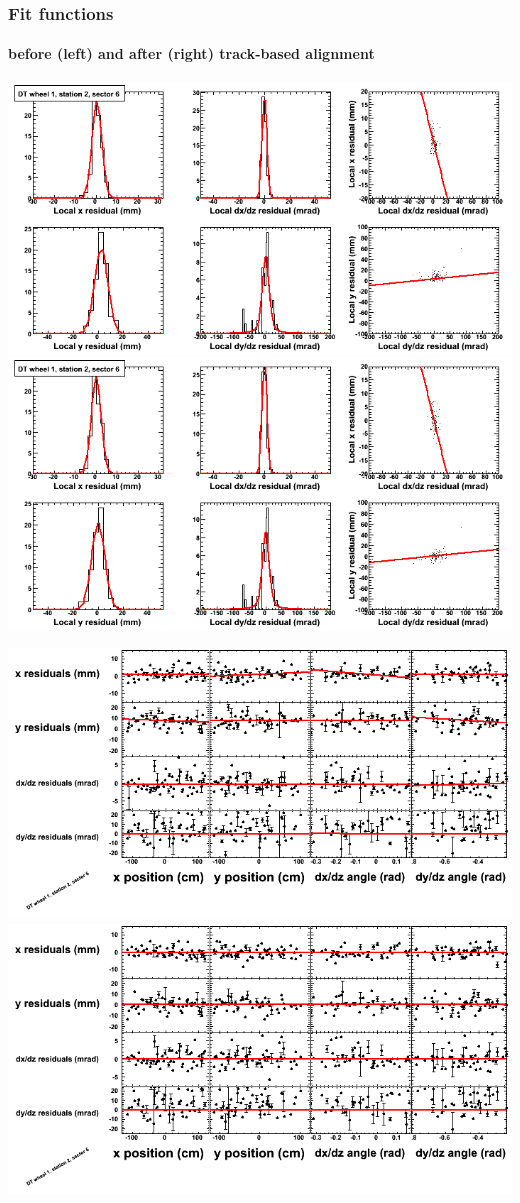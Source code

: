 \documentclass[compress]{beamer}
\begin{document}
\begin{frame}
\frametitle{Fit functions}
\framesubtitle{before (left) and after (right) track-based alignment}
\includegraphics[width=0.5\linewidth]{fitfunctions_re01/MBwhDst2sec06_bellcurves.png} \includegraphics[width=0.5\linewidth]{fitfunctions_re05/MBwhDst2sec06_bellcurves.png}

\includegraphics[width=0.5\linewidth]{fitfunctions_re01/MBwhDst2sec06_polynomials.png} \includegraphics[width=0.5\linewidth]{fitfunctions_re05/MBwhDst2sec06_polynomials.png}
\end{frame}
\end{document}
